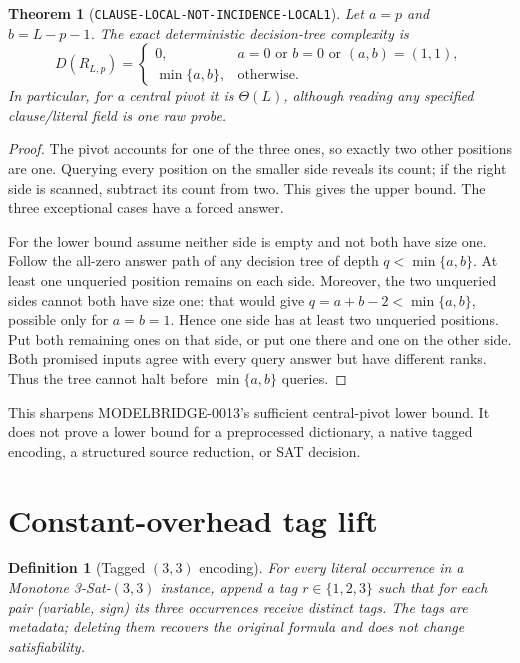 \documentclass[11pt]{article}
\newtheorem{definition}{Definition}
\newtheorem{theorem}{Theorem}
\begin{document}
\begin{theorem}[\texttt{CLAUSE-LOCAL-NOT-INCIDENCE-LOCAL1}]
Let $a=p$ and $b=L-p-1$.  The exact deterministic decision-tree complexity is
\[
 D(R_{L,p})=
 \begin{cases}
 0,&a=0\text{ or }b=0\text{ or }(a,b)=(1,1),\\
 \min\{a,b\},&\text{otherwise}.
 \end{cases}
\]
In particular, for a central pivot it is $\Theta(L)$, although reading any
specified clause/literal field is one raw probe.
\end{theorem}
\begin{proof}
The pivot accounts for one of the three ones, so exactly two other positions
are one.  Querying every position on the smaller side reveals its count; if
the right side is scanned, subtract its count from two.  This gives the upper
bound.  The three exceptional cases have a forced answer.

For the lower bound assume neither side is empty and not both have size one.
Follow the all-zero answer path of any decision tree of depth
$q<\min\{a,b\}$.  At least one unqueried position remains on each side.
Moreover, the two unqueried sides cannot both have size one: that would give
$q=a+b-2<\min\{a,b\}$, possible only for $a=b=1$.  Hence one side has at
least two unqueried positions.  Put both remaining ones on that side, or put
one there and one on the other side.  Both promised inputs agree with every
query answer but have different ranks.  Thus the tree cannot halt before
$\min\{a,b\}$ queries.
\end{proof}

This sharpens MODELBRIDGE-0013's sufficient central-pivot lower bound.  It
does not prove a lower bound for a preprocessed dictionary, a native tagged
encoding, a structured source reduction, or SAT decision.

\section{Constant-overhead tag lift}

\begin{definition}[Tagged $(3,3)$ encoding]
For every literal occurrence in a Monotone 3-Sat-$(3,3)$ instance, append a
tag $r\in\{1,2,3\}$ such that for each pair (variable, sign) its three
occurrences receive distinct tags.  The tags are metadata; deleting them
recovers the original formula and does not change satisfiability.
\end{definition}
\end{document}
